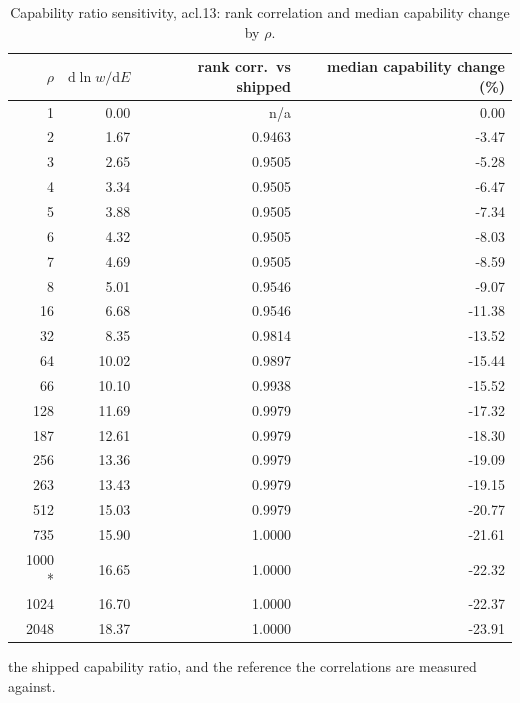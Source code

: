 \begin{table}[htbp]
  \centering
  \caption{Capability ratio sensitivity, acl.13: rank correlation and median capability change by $\rho$.}
  \label{tab:rho-acl-13-summary}
  \begin{tabular}{r r r r}
    \toprule
    $\rho$ & $\mathrm{d}\ln w/\mathrm{d}E$ & rank corr.\ vs shipped & median capability change (\%) \\
    \midrule
    1 & 0.00 & n/a & 0.00 \\
    2 & 1.67 & 0.9463 & -3.47 \\
    3 & 2.65 & 0.9505 & -5.28 \\
    4 & 3.34 & 0.9505 & -6.47 \\
    5 & 3.88 & 0.9505 & -7.34 \\
    6 & 4.32 & 0.9505 & -8.03 \\
    7 & 4.69 & 0.9505 & -8.59 \\
    8 & 5.01 & 0.9546 & -9.07 \\
    16 & 6.68 & 0.9546 & -11.38 \\
    32 & 8.35 & 0.9814 & -13.52 \\
    64 & 10.02 & 0.9897 & -15.44 \\
    66 & 10.10 & 0.9938 & -15.52 \\
    128 & 11.69 & 0.9979 & -17.32 \\
    187 & 12.61 & 0.9979 & -18.30 \\
    256 & 13.36 & 0.9979 & -19.09 \\
    263 & 13.43 & 0.9979 & -19.15 \\
    512 & 15.03 & 0.9979 & -20.77 \\
    735 & 15.90 & 1.0000 & -21.61 \\
    1000 * & 16.65 & 1.0000 & -22.32 \\
    1024 & 16.70 & 1.0000 & -22.37 \\
    2048 & 18.37 & 1.0000 & -23.91 \\
    \bottomrule
  \end{tabular}
  \par\smallskip\footnotesize * the shipped capability ratio, and the reference the correlations are measured against.
\end{table}
